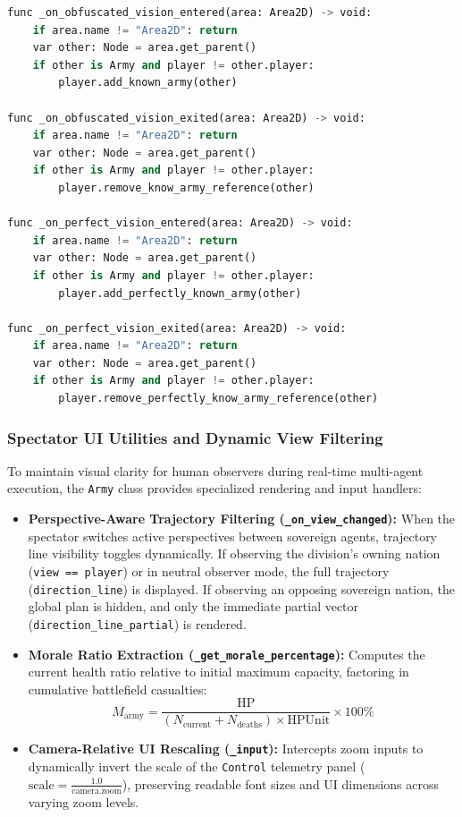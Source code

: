 \begin{lstlisting}[language=python, caption={Concentric vision radius signal handlers managing Fog of War telemetry updates in GDScript.}, label={lst:vision_signals}]
func _on_obfuscated_vision_entered(area: Area2D) -> void:
    if area.name != "Area2D": return
    var other: Node = area.get_parent()
    if other is Army and player != other.player:
        player.add_known_army(other)

func _on_obfuscated_vision_exited(area: Area2D) -> void:
    if area.name != "Area2D": return
    var other: Node = area.get_parent()
    if other is Army and player != other.player:
        player.remove_know_army_reference(other)

func _on_perfect_vision_entered(area: Area2D) -> void:
    if area.name != "Area2D": return
    var other: Node = area.get_parent()
    if other is Army and player != other.player:
        player.add_perfectly_known_army(other)

func _on_perfect_vision_exited(area: Area2D) -> void:
    if area.name != "Area2D": return
    var other: Node = area.get_parent()
    if other is Army and player != other.player:
        player.remove_perfectly_know_army_reference(other)
\end{lstlisting}

\subsubsection{Spectator UI Utilities and Dynamic View Filtering}
To maintain visual clarity for human observers during real-time multi-agent execution, the \texttt{Army} class provides specialized rendering and input handlers:

\begin{itemize}
    \item \textbf{Perspective-Aware Trajectory Filtering (\texttt{\_on\_view\_changed}):} When the spectator switches active perspectives between sovereign agents, trajectory line visibility toggles dynamically. If observing the division's owning nation (\texttt{view == player}) or in neutral observer mode, the full trajectory (\texttt{direction\_line}) is displayed. If observing an opposing sovereign nation, the global plan is hidden, and only the immediate partial vector (\texttt{direction\_line\_partial}) is rendered.
    \item \textbf{Morale Ratio Extraction (\texttt{\_get\_morale\_percentage}):} Computes the current health ratio relative to initial maximum capacity, factoring in cumulative battlefield casualties:
    \begin{equation}
        M_{\text{army}} = \frac{\text{HP}}{(N_{\text{current}} + N_{\text{deaths}}) \times \text{HPUnit}} \times 100\%
    \end{equation}
    \item \textbf{Camera-Relative UI Rescaling (\texttt{\_input}):} Intercepts zoom inputs to dynamically invert the scale of the \texttt{Control} telemetry panel ($\text{scale} = \frac{1.0}{\text{camera.zoom}}$), preserving readable font sizes and UI dimensions across varying zoom levels.
\end{itemize}

